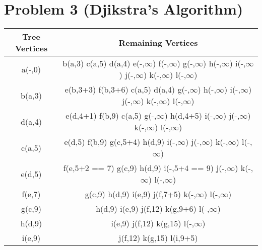 \documentclass{article}
\begin{document}
\newpage

\section*{Problem 3 (Djikstra's Algorithm)}
\begin{table}[ht]
    \centering
    \begin{tabular}{|c|c|}
        \hline
        \textbf{Tree Vertices} & \textbf{Remaining Vertices}                                                                                                          \\
        \hline
        a(-,0)                 & b(a,3) c(a,5) d(a,4) e(-,$\infty$) f(-,$\infty$) g(-,$\infty$) h(-,$\infty$) i(-,$\infty$) j(-,$\infty$) k(-,$\infty$) l(-,$\infty$) \\
        \hline
        b(a,3)                 & e(b,3+3) f(b,3+6) c(a,5) d(a,4) g(-,$\infty$) h(-,$\infty$) i(-,$\infty$) j(-,$\infty$) k(-,$\infty$) l(-,$\infty$)                  \\
        \hline
        d(a,4)                 & e(d,4+1) f(b,9) c(a,5) g(-,$\infty$) h(d,4+5) i(-,$\infty$) j(-,$\infty$) k(-,$\infty$) l(-,$\infty$)                                \\
        \hline
        c(a,5)                 & e(d,5) f(b,9) g(c,5+4) h(d,9) i(-,$\infty$) j(-,$\infty$) k(-,$\infty$) l(-,$\infty$)                                                \\
        \hline
        e(d,5)                 & f(e,5+2 == 7) g(c,9) h(d,9) i(-,5+4 == 9) j(-,$\infty$) k(-,$\infty$) l(-,$\infty$)                                                  \\
        \hline
        f(e,7)                 & g(c,9) h(d,9) i(e,9) j(f,7+5) k(-,$\infty$) l(-,$\infty$)                                                                            \\
        \hline
        g(c,9)                 & h(d,9) i(e,9) j(f,12) k(g,9+6) l(-,$\infty$)                                                                                         \\
        \hline
        h(d,9)                 & i(e,9) j(f,12) k(g,15) l(-,$\infty$)                                                                                                 \\
        \hline
        i(e,9)                 & j(f,12) k(g,15) l(i,9+5)                                                                                                             \\

\end{tabular}
\end{table}
\end{document}
